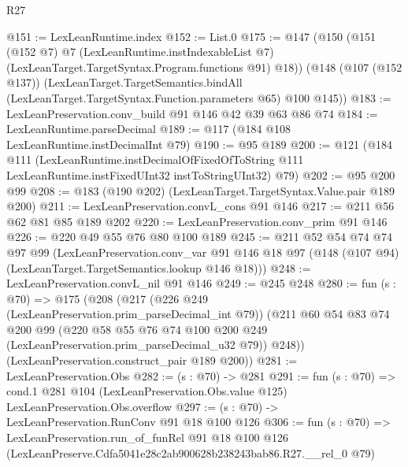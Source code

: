 \begin{lexlean}{R27}
\begin{coremodule}
@151 := LexLeanRuntime.index
@152 := List.{0}
@175 := @147
    (@150
      (@151
        (@152 @7)
        @7
        (LexLeanRuntime.instIndexableList @7)
        (LexLeanTarget.TargetSyntax.Program.functions @91)
        @18))
    (@148
      (@107 (@152 @137))
      (LexLeanTarget.TargetSemantics.bindAll
        (LexLeanTarget.TargetSyntax.Function.parameters @65)
        @100
        @145))
@183 := LexLeanPreservation.conv_build @91 @146 @42 @39 @63 @86 @74
@184 := LexLeanRuntime.parseDecimal
@189 := @117 (@184 @108 LexLeanRuntime.instDecimalInt @79)
@190 := @95 @189
@200 := @121
    (@184
      @111
      (LexLeanRuntime.instDecimalOfFixedOfToString
        @111
        LexLeanRuntime.instFixedUInt32
        instToStringUInt32)
      @79)
@202 := @95 @200 @99
@208 := @183 (@190 @202) (LexLeanTarget.TargetSyntax.Value.pair @189 @200)
@211 := LexLeanPreservation.convL_cons @91 @146
@217 := @211 @56 @62 @81 @85 @189 @202
@220 := LexLeanPreservation.conv_prim @91 @146
@226 := @220 @49 @55 @76 @80 @100 @189
@245 := @211
    @52
    @54
    @74
    @74
    @97
    @99
    (LexLeanPreservation.conv_var
      @91
      @146
      @18
      @97
      (@148 (@107 @94) (LexLeanTarget.TargetSemantics.lookup @146 @18)))
@248 := LexLeanPreservation.convL_nil @91 @146
@249 := @245 @248
@280 := fun (s : @70) =>
  @175
    (@208
      (@217
        (@226 @249 (LexLeanPreservation.prim_parseDecimal_int @79))
        (@211
          @60
          @54
          @83
          @74
          @200
          @99
          (@220 @58 @55 @76 @74 @100 @200 @249 (LexLeanPreservation.prim_parseDecimal_u32 @79))
          @248))
      (LexLeanPreservation.construct_pair @189 @200))
@281 := LexLeanPreservation.Obs
@282 := (s : @70) -> @281
@291 := fun (s : @70) =>
  cond.{1} @281 @104 (LexLeanPreservation.Obs.value @125) LexLeanPreservation.Obs.overflow
@297 := (s : @70) -> LexLeanPreservation.RunConv @91 @18 @100 @126
@306 := fun (s : @70) =>
  LexLeanPreservation.run_of_funRel
    @91
    @18
    @100
    @126
    (LexLeanPreserve.Cdfa5041e28c2ab900628b238243bab86.R27.__rel_0 @79)
\end{coremodule}
\end{lexlean}
